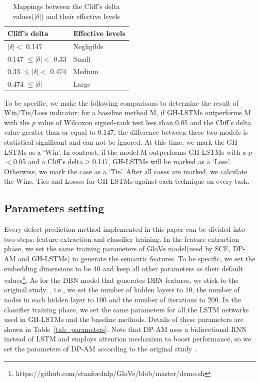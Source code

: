 \documentclass[journal]{IEEEtran}
\begin{document}
\begin{table}[htbp]
	\footnotesize
	\caption{Mappings between the Cliff's delta values($|\delta|$) and their effective levels}
	\label{tab_delta}
	\tabcolsep 30pt
	\centering
	\begin{tabular}{ ll}
		\toprule
		Cliff's delta                  & Effective levels \\\midrule
		$|\delta| <$ 0.147             & Negligible       \\
		0.147 $\leq |\delta| <$ 0.33   & Small            \\
		0.33 $\leq |\delta| <$ 0.474   & Medium           \\
		0.474 $\leq |\delta|$         & Large             \\
		\bottomrule
	\end{tabular}
\end{table}

To be specific, we make the following comparisons to determine the result of Win/Tie/Loss indicator: for a baseline method M, if GH-LSTMs outperforms M with the $p$ value of Wilcoxon signed-rank test less than 0.05 and the Cliff's delta value greater than or equal to 0.147, the difference between these two models is statistical significant and can not be ignored. At this time, we mark the GH-LSTMs as a `Win'. In contrast, if the model M outperforms GH-LSTMs with a $p$ $<$0.05 and a Cliff's delta$\geq$0.147, GH-LSTMs will be marked as a `Loss'. Otherwise, we mark the case as a `Tie'. After all cases are marked, we calculate the Wins, Ties and Losses for GH-LSTMs against each technique on every task.



\subsection{Parameters setting}
Every defect prediction method implemented in this paper can be divided into two steps: feature extraction and classifier training. In the feature extraction phase, we set the same training parameters of GloVe model(used by SCE, DP-AM and GH-LSTMs) to generate the semantic features. To be specific, we set the embedding dimensions to be 40 and keep all other parameters as their default values\footnote{https://github.com/stanfordnlp/GloVe/blob/master/demo.sh}. As for the DBN model that generates DBN features, we stick to the original study~\cite{wang2018deep}, i.e., we set the number of hidden layers to 10, the number of nodes in each hidden layer to 100 and the number of iterations to 200. In the classifier training phase, we set the same parameters for all the LSTM networks used in GH-LSTMs and the baseline methods. Details of these parameters are shown in Table~\ref{tab_parameters}. Note that DP-AM uses a bidirectional RNN instead of LSTM and employs attention mechanism to boost performance, so we set the parameters of DP-AM according to the original study~\cite{fan2019deep}.
\end{document}
